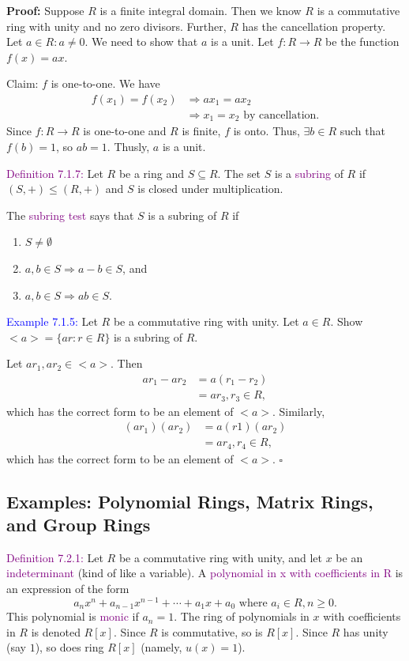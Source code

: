 \documentclass{article}
\begin{document}
\textbf{Proof:} Suppose $R$ is a finite integral domain. Then we know $R$ is a commutative ring with unity and no zero divisors. Further, 
$R$ has the cancellation property. Let $a \in R: a \neq 0$. We need to show that $a$ is a unit. Let $f:R \longrightarrow R$ be the function 
$f(x)=ax$.

Claim: $f$ is one-to-one. We have
\begin{align*}
    f(x_1)=f(x_2) &\Longrightarrow ax_1=ax_2 \\
    &\Longrightarrow x_1=x_2 \text{ by cancellation.}
\end{align*}
Since $f:R \longrightarrow R$ is one-to-one and $R$ is finite, $f$ is onto. Thus, $\exists b \in R$ such that $f(b)=1$, so $ab=1$. Thusly, 
$a$ is a unit.

\textcolor{purple}{Definition 7.1.7:} Let $R$ be a ring and $S \subseteq R$. The set $S$ is a \textcolor{purple}{subring} of 
$R$ if $(S,+) \leq (R,+)$ and $S$ is closed under multiplication.

The \textcolor{purple}{subring test} says that $S$ is a subring of $R$ if 
\begin{enumerate}
    \item $S \neq \emptyset$ 
    \item $a,b \in S \Longrightarrow a-b \in S$, and 
    \item $a,b \in S \Longrightarrow ab \in S$.
\end{enumerate}

\textcolor{blue}{Example 7.1.5:} Let $R$ be a commutative ring with unity. Let $a \in R$. Show $<a> = \{ar: r \in R\}$ is a subring of $R$.

Let $ar_1, ar_2 \in <a>$. Then
\begin{align*}
    ar_1-ar_2 &= a(r_1-r_2) \\
    &= ar_3, r_3 \in R,
\end{align*}
which has the correct form to be an element of $<a>$. Similarly,
\begin{align*}
    (ar_1)(ar_2) &= a(r1)(ar_2) \\
    &= ar_4, r_4 \in R,
\end{align*}
which has the correct form to be an element of $<a>$. $\square$

\subsection{Examples: Polynomial Rings, Matrix Rings, and Group Rings}

\textcolor{purple}{Definition 7.2.1:} Let $R$ be a commutative ring with unity, and let $x$ be an \textcolor{purple}{indeterminant} (kind 
of like a variable). A \textcolor{purple}{polynomial in x with coefficients in R} is an expression of the form
\[
    a_nx^n + a_{n-1}x^{n-1} + \cdots + a_1x + a_0 \text{ where } a_i \in R, n \geq 0.
\]
This polynomial is \textcolor{purple}{monic} if $a_n=1$. The ring of polynomials in $x$ with coefficients in $R$ is denoted $R[x]$. Since 
$R$ is commutative, so is $R[x]$. Since $R$ has unity (say $1$), so does ring $R[x]$ (namely, $u(x)=1$).
\end{document}
